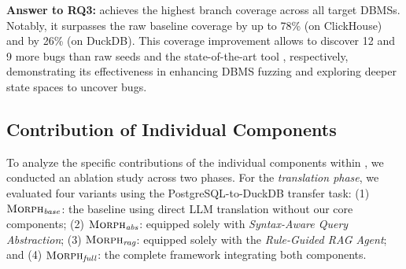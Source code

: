 \documentclass[sigconf,review,anonymous]{acmart}
\begin{document}
\begin{table}[!htbp]
\centering
\caption{Comparison of Covered Branch and Detected Bugs (24h). $S^-$, $S$, and $S^+$ denote Raw Seeds, \sedar{}, and \tool{}. Percentages in 4th column indicates coverage improvement over $S$.}
\label{tab:coverage}
\renewcommand\arraystretch{1}
\end{table}

\begin{answerbox}
\textbf{Answer to RQ3:} \tool{} achieves the highest branch coverage across all target DBMSs. Notably, it surpasses the raw baseline coverage by up to 78\% (on ClickHouse) and \sedar{} by 26\% (on DuckDB). 
This coverage improvement allows \tool{} to discover 12 and 9 more bugs than raw seeds and the state-of-the-art tool \sedar{}, respectively, demonstrating its effectiveness in enhancing DBMS fuzzing and exploring deeper state spaces to uncover bugs.
\end{answerbox}

\subsection{Contribution of Individual Components}
To analyze the specific contributions of the individual components within \tool{}, we conducted an ablation study across two phases. For the \textit{translation phase}, we evaluated four variants using the PostgreSQL-to-DuckDB transfer task:
(1) $\textsc{Morph}{}_{\textit{base}}$: the baseline using direct LLM translation without our core components;
(2) $\textsc{Morph}{}_{\textit{abs}}$: equipped solely with \textit{Syntax-Aware Query Abstraction};
(3) $\textsc{Morph}{}_{\textit{rag}}$: equipped solely with the \textit{Rule-Guided RAG Agent}; and
(4) $\textsc{Morph}{}_{\textit{full}}$: the complete framework integrating both components.
\end{document}
